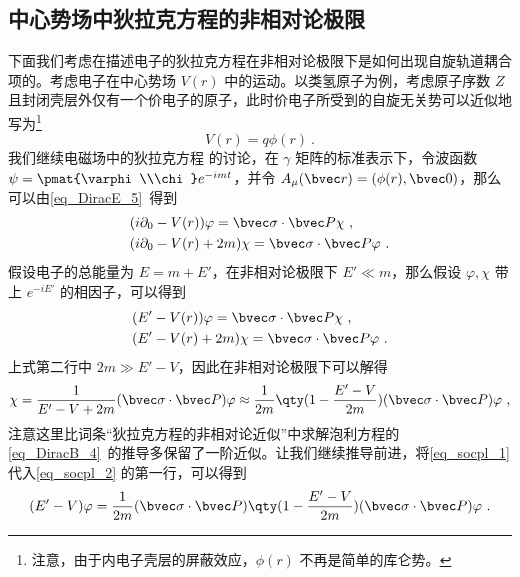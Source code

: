 \subsection{中心势场中狄拉克方程的非相对论极限}
\cite{曾谨言}下面我们考虑在描述电子的狄拉克方程在非相对论极限下是如何出现自旋轨道耦合项的。考虑电子在中心势场 $V(r)$ 中的运动。以类氢原子为例，考虑原子序数 $Z$ 且封闭壳层外仅有一个价电子的原子，此时价电子所受到的自旋无关势可以近似地写为\footnote{注意，由于内电子壳层的屏蔽效应，$\phi(r)$ 不再是简单的库仑势。}
\begin{equation}
V(r)=q\phi(r)~.
\end{equation}
我们继续电磁场中的狄拉克方程 的讨论，在 $\gamma$ 矩阵的标准表示下，令波函数 $\psi=\pmat{\varphi\\\chi}e^{-imt}$，并令 $A_\mu(\bvec r)=(\phi(r),\bvec 0)$，那么可以由\autoref{eq_DiracE_5}~得到
\begin{equation}
\begin{aligned}
&(i\partial_0 - V(r))\varphi = \bvec \sigma\cdot \bvec P \chi~,\\
&(i\partial_0 - V(r) + 2m) \chi = \bvec \sigma\cdot \bvec P  \varphi~.
\end{aligned}
\end{equation}
假设电子的总能量为 $E=m+E'$，在非相对论极限下 $E'\ll m$，那么假设 $\varphi,\chi$ 带上 $e^{-iE'}$ 的相因子，可以得到
\begin{equation}\label{eq_socpl_2}
\begin{aligned}
&(E' - V(r))\varphi = \bvec \sigma\cdot \bvec P \chi~,\\
&(E' - V(r) + 2m) \chi = \bvec \sigma\cdot \bvec P  \varphi~.
\end{aligned}
\end{equation}
上式第二行中 $2m\gg E'-V$，因此在非相对论极限下可以解得
\begin{equation}\label{eq_socpl_1}
\chi = \frac{1}{E'-V+2m}(\bvec \sigma\cdot \bvec P)\varphi
\approx\frac{1}{2m}\qty(1-\frac{E'-V}{2m})(\bvec \sigma\cdot \bvec P) \varphi~,
\end{equation}
注意这里比词条“狄拉克方程的非相对论近似”中求解泡利方程的\autoref{eq_DiracB_4}~的推导多保留了一阶近似。让我们继续推导前进，将\autoref{eq_socpl_1} 代入\autoref{eq_socpl_2} 的第一行，可以得到
\begin{equation}
(E'-V)\varphi = \frac{1}{2m}(\bvec \sigma\cdot \bvec P)\qty(1-\frac{E'-V}{2m})(\bvec \sigma\cdot \bvec P)\varphi~.
\end{equation}
